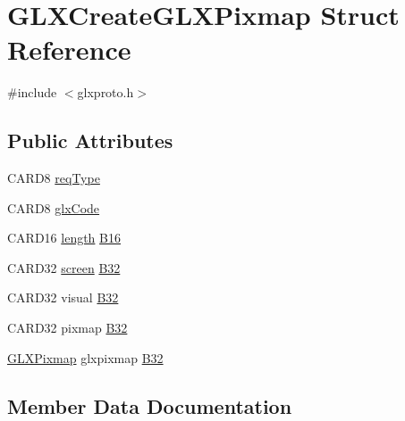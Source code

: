 \hypertarget{struct_g_l_x_create_g_l_x_pixmap}{}\section{G\+L\+X\+Create\+G\+L\+X\+Pixmap Struct Reference}
\label{struct_g_l_x_create_g_l_x_pixmap}


{\ttfamily \#include $<$glxproto.\+h$>$}

\subsection*{Public Attributes}
\begin{DoxyCompactItemize}
\item 
C\+A\+R\+D8 \hyperlink{struct_g_l_x_create_g_l_x_pixmap_acf6439c403caab63f054e7b392ecc4a8}{req\+Type}
\item 
C\+A\+R\+D8 \hyperlink{struct_g_l_x_create_g_l_x_pixmap_abf7327a2e04cfbefa15527fae7ec54cd}{glx\+Code}
\item 
C\+A\+R\+D16 \hyperlink{glcorearb_8h_ab9c919755bde3b34349e23a32b4e0fa7}{length} \hyperlink{struct_g_l_x_create_g_l_x_pixmap_ad909599d11dea6f5152eb2e4fcd54bda}{B16}
\item 
C\+A\+R\+D32 \hyperlink{cad_8h_ae04e09e4e3831bfc1632c509ae37dcec}{screen} \hyperlink{struct_g_l_x_create_g_l_x_pixmap_a29933a0e61c346d624af39f70f77f19b}{B32}
\item 
C\+A\+R\+D32 visual \hyperlink{struct_g_l_x_create_g_l_x_pixmap_a8740283e60772cb4903f8fe3c3c00c83}{B32}
\item 
C\+A\+R\+D32 pixmap \hyperlink{struct_g_l_x_create_g_l_x_pixmap_a0ad79486433c174c6ecd1d7f15df7b36}{B32}
\item 
\hyperlink{glx_8h_a6577d581069de43ebaac50c78dbccbd0}{G\+L\+X\+Pixmap} glxpixmap \hyperlink{struct_g_l_x_create_g_l_x_pixmap_a659167e7aa1cc2dfc783c687d2d49ba3}{B32}
\end{DoxyCompactItemize}


\subsection{Member Data Documentation}
\mbox{\label{struct_g_l_x_create_g_l_x_pixmap_ad909599d11dea6f5152eb2e4fcd54bda}} 
